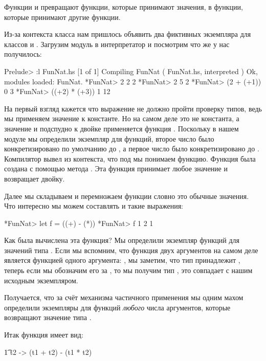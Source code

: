 Функции  и  превращают функции, которые
принимают значения, в функции, которые принимают другие
функции. 

Из-за контекста класса  нам пришлось объявить 
два фиктивных экземпляра для классов  и .
Загрузим модуль  в интерпретатор и 
посмотрим что же у нас получилось:

\begin{code}
Prelude> :l FunNat.hs
[1 of 1] Compiling FunNat           ( FunNat.hs, interpreted )
Ok, modules loaded: FunNat.
*FunNat> 2 2
2
*FunNat> 2 5
2
*FunNat> (2 + (+1)) 0 
3
*FunNat> ((+2) * (+3)) 1
12
\end{code}

На первый взгляд кажется что выражение  не должно
пройти проверку типов, ведь мы применяем значение к константе.
Но на самом деле  это не константа, а значение 
и подспудно к двойке применяется функция .
Поскольку в нашем модуле мы определили экземпляр  для
функций, второе число  было конкретизировано по умолчанию 
до , а первое число  было конкретизировано
до . Компилятор вывел из контекста,
что под  мы понимаем функцию. Функция была создана 
с помощью метода . Эта функция принимает любое 
значение и возвращает двойку.

Далее мы складываем и перемножаем функции словно это обычные значения.
Что интересно мы можем составлять и такие выражения:

\begin{code}
*FunNat> let f = ((+) - (*))
*FunNat> f 1 2
1
\end{code}

Как была вычислена эта функция? Мы определили экземпляр функций
для значений типа . Если мы вспомним, что
функция двух аргументов на самом деле является функцией одного
аргумента: , мы заметим, что 
тип  принадлежит , теперь если 
мы обозначим его за , то мы получим тип ,
это совпадает с нашим исходным экземпляром. 

Получается, что за счёт механизма частичного применения мы одним
махом определили экземпляры  для функций \emph{любого} 
числа аргументов, которые возвращают значение типа .

Итак функция  имеет вид:

\begin{code}
\t1 t2 -> (t1 + t2) - (t1 * t2)
\end{code}

